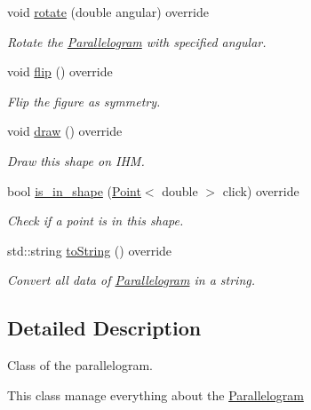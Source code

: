 \begin{DoxyCompactItemize}
void \hyperlink{classParallelogram_ac498f6a15dea236ecc49bece023d17b0}{rotate} (double angular) override
\begin{DoxyCompactList}\small\item\em Rotate the \hyperlink{classParallelogram}{Parallelogram} with specified angular. \end{DoxyCompactList}\item 
\mbox{\label{classParallelogram_a51f002e90b7bf6c5d875cc094c22f7c1}} 
void \hyperlink{classParallelogram_a51f002e90b7bf6c5d875cc094c22f7c1}{flip} () override
\begin{DoxyCompactList}\small\item\em Flip the figure as symmetry. \end{DoxyCompactList}\item 
\mbox{\label{classParallelogram_a73e3657bf024787b57ccdd8035a6fdef}} 
void \hyperlink{classParallelogram_a73e3657bf024787b57ccdd8035a6fdef}{draw} () override
\begin{DoxyCompactList}\small\item\em Draw this shape on I\+HM. \end{DoxyCompactList}\item 
bool \hyperlink{classParallelogram_a9ba441d86d6311bba489e998c87dddf6}{is\+\_\+in\+\_\+shape} (\hyperlink{classPoint}{Point}$<$ double $>$ click) override
\begin{DoxyCompactList}\small\item\em Check if a point is in this shape. \end{DoxyCompactList}\item 
std\+::string \hyperlink{classParallelogram_a9caae0044f23d8a1e87b1a78d852c37f}{to\+String} () override
\begin{DoxyCompactList}\small\item\em Convert all data of \hyperlink{classParallelogram}{Parallelogram} in a string. \end{DoxyCompactList}\end{DoxyCompactItemize}


\subsection{Detailed Description}
Class of the parallelogram. 

This class manage everything about the \hyperlink{classParallelogram}{Parallelogram} 

